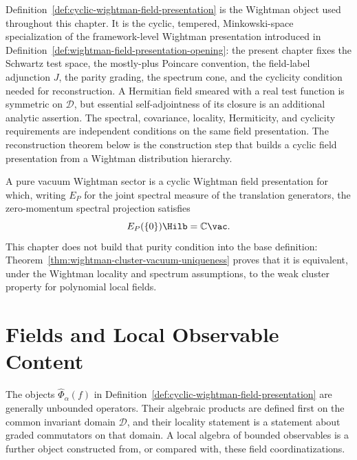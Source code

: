 Definition~\ref{def:cyclic-wightman-field-presentation} is the Wightman object
used throughout this chapter.  It is the cyclic, tempered, Minkowski-space
specialization of the framework-level Wightman presentation introduced in
Definition~\ref{def:wightman-field-presentation-opening}: the present chapter
fixes the Schwartz test space, the mostly-plus Poincare convention, the
field-label adjunction \(J\), the parity grading, the spectrum cone, and the
cyclicity condition needed for reconstruction.  A Hermitian field smeared
with a real test function is symmetric on \(\mathcal D\), but essential
self-adjointness of its closure is an additional analytic assertion.  The
spectral, covariance, locality, Hermiticity, and cyclicity requirements are
independent conditions on the same field presentation.  The reconstruction
theorem below is the construction step that builds a cyclic field
presentation from a Wightman distribution hierarchy.

A pure vacuum Wightman sector is a cyclic Wightman field presentation for
which, writing \(E_P\) for the joint spectral measure of the translation
generators, the zero-momentum spectral projection satisfies
\[
  E_P(\{0\})\Hilb=\mathbb C\vac .
\]
This chapter does not build that purity condition into the base definition:
Theorem~\ref{thm:wightman-cluster-vacuum-uniqueness} proves that it is
equivalent, under the Wightman locality and spectrum assumptions, to the weak
cluster property for polynomial local fields.

\section{Fields and Local Observable Content}

The objects \(\widehat\Phi_\alpha(f)\) in
Definition~\ref{def:cyclic-wightman-field-presentation} are generally
unbounded operators.  Their algebraic products are defined first on the common
invariant domain \(\mathcal D\), and their locality statement is a statement
about graded commutators on that domain.  A local algebra of bounded
observables is a further object constructed from, or compared with, these
field coordinatizations.

